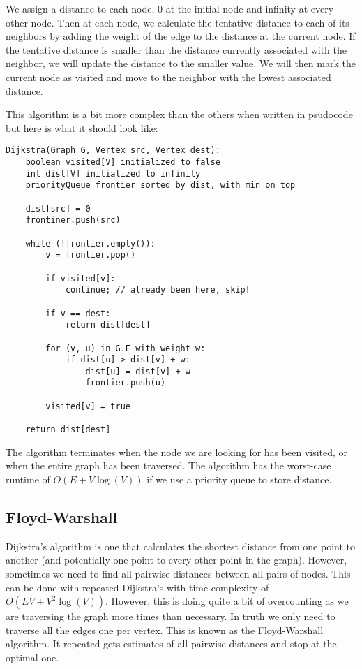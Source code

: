 \documentclass[12 pt, twoside] {article}
\begin{document}
{We assign a distance to each node, 0 at the initial node and infinity at every
other node. Then at each node, we calculate the tentative distance to each of
its neighbors by adding the weight of the edge to the distance at the current
node. If the tentative distance is smaller than the distance currently
associated with the neighbor, we will update the distance to the smaller value.
We will then mark the current node as visited and move to the neighbor with the
lowest associated distance.

This algorithm is a bit more complex than the others when written in psudocode
but here is what it should look like:
\begin{verbatim}
Dijkstra(Graph G, Vertex src, Vertex dest):
    boolean visited[V] initialized to false
    int dist[V] initialized to infinity
    priorityQueue frontier sorted by dist, with min on top

    dist[src] = 0
    frontiner.push(src)

    while (!frontier.empty()):
        v = frontier.pop()
        
        if visited[v]:
            continue; // already been here, skip!

        if v == dest:
            return dist[dest]

        for (v, u) in G.E with weight w:
            if dist[u] > dist[v] + w:
                dist[u] = dist[v] + w
                frontier.push(u)

        visited[v] = true

    return dist[dest]
\end{verbatim}

The algorithm terminates when the node we are looking for has been visited, or
when the entire graph has been traversed. The algorithm has the worst-case
runtime of $O(E + V \log(V))$ if we use a priority queue to store distance.

\subsection*{Floyd-Warshall}

Dijkstra's algorithm is one that calculates the shortest distance from one point
to another (and potentially one point to every other point in the graph).
However, sometimes we need to find all pairwise distances between all pairs of
nodes. This can be done with repeated Dijkstra's with time complexity of $O(EV +
V^2 \log(V))$. However, this is doing quite a bit of overcounting as we are
traversing the graph more times than necessary. In truth we only need to
traverse all the edges one per vertex. This is known as the Floyd-Warshall
algorithm. It repeated gets estimates of all pairwise distances and stop at the
optimal one.

}
\end{document}

